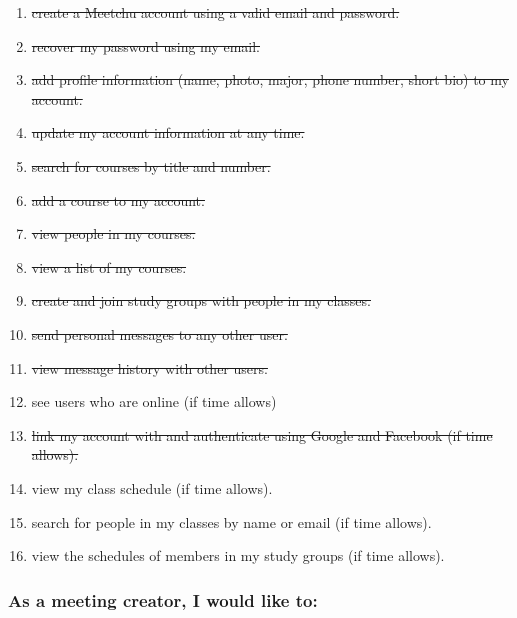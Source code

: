 \documentclass[12pt]{article}
\begin{document}
\begin{enumerate}[nolistsep]
    \item \st{create a Meetchu account using a valid email and password.}
    \item \st{recover my password using my email.}
    \item \st{add profile information (name, photo, major, phone number, short bio) to my account.}
    \item \st{update my account information at any time.}
    \item \st{search for courses by title and number.}
    \item \st{add a course to my account.}
    \item \st{view people in my courses.}
    \item \st{view a list of my courses.}
    \item \st{create and join study groups with people in my classes.}
    \item \st{send personal messages to any other user.}
    \item \st{view message history with other users.}
    \item see users who are online (if time allows)
    \item \st{link my account with and authenticate using Google and Facebook (if time allows).}
    \item view my class schedule (if time allows).
    \item search for people in my classes by name or email (if time allows).
    \item view the schedules of members in my study groups (if time allows).
\end{enumerate}

\subsubsection*{As a meeting creator, I would like to:}
\end{document}
